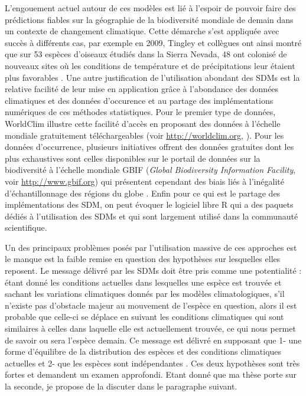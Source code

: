 L'engouement actuel autour de ces modèles est lié à l'espoir de pouvoir
faire des prédictions fiables sur la géographie de la biodiversité
mondiale de demain dans un contexte de changement climatique. Cette
démarche s'est appliquée avec succès à différents cas, par exemple en
2009, Tingley et collègues ont ainsi montré que sur 53 espèces d'oiseaux
étudiés dans la Sierra Nevada, 48 ont colonisé de nouveaux sites où les
conditions de température et de précipitations leur étaient plus
favorables \citep{Tingley2009}. Une autre justification de l'utilisation
abondant des SDMs est la relative facilité de leur mise en application
grâce à l'abondance des données climatiques et des données d'occurence
et au partage des implémentations numériques de ces méthodes
statistiques. Pour le premier type de données, WorldClim illustre cette
facilité d'accès en proposant des données à l'échelle mondiale
gratuitement téléchargeables (voir \url{http://worldclim.org},
\citet{Hijmans2005}). Pour les données d'occurrence, plusieurs
initiatives offrent des données gratuites dont les plus exhaustives sont
celles disponibles sur le portail de données sur la biodiversité à
l'échelle mondiale GBIF (\emph{Global Biodiversity Information
Facility}, voir \url{http://www.gbif.org}) qui présentent cependant des
biais liés à l'inégalité d'échantillonnage des régions du globe
\citep{Beck2014a}. Enfin pour ce qui est le partage des implémentations
des SDM, on peut évoquer le logiciel libre R \citep{Rcoreteam2015} qui a
des paquets dédiés à l'utilisation des SDMs et qui sont largement
utilisé dans la communauté scientifique.

Un des principaux problèmes posés par l'utilisation massive de ces
approches est le manque est la faible remise en question des hypothèses
sur lesquelles elles reposent. Le message délivré par les SDMs doit être
pris comme une potentialité : étant donné les conditions actuelles dans
lesquelles une espèce est trouvée et sachant les variations climatiques
donnés par les modèles climatologiques, s'il n'existe pas d'obstacle
majeur au mouvement de l'espèce en question, alors il est probable que
celle-ci se déplace en suivant les conditions climatiques qui sont
similaires à celles dans laquelle elle est actuellement trouvée, ce qui
nous permet de savoir ou sera l'espèce demain. Ce message est délivré en
supposant que 1- une forme d'équilibre de la distribution des espèces et
des conditions climatiques actuelles et 2- que les espèces sont
indépendantes \citep{Jeschke2008}. Ces deux hypothèses sont très fortes
et demandent un examen approfondi. Etant donné que ma thèse porte sur la
seconde, je propose de la discuter dans le paragraphe suivant.

